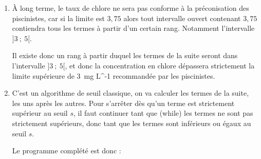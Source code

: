 \documentclass[10pt]{article}
\providecommand{\R}{\mathbb{R}}
\providecommand{\N}{\mathbb{N}}
\providecommand{\np}[2][]{{#2~#1}}
\begin{document}
\begin{enumerate}
\begin{enumerate}
		\item De la question précédente, on retient :
		\begin{itemize}
			\item $\forall n \in \N,\quad v_n \leqslant v_{n+1}$\quad donc la suite $\left(v_n\right)$ est croissante;
			\item $\forall n \in \N,\quad v_n \leqslant 4$ \quad donc la suite $\left(v_n\right)$ est majorée par 4.
		\end{itemize}
D'après le théorème de croissance monotone la suite $\left(v_n\right)$ est donc convergente, vers une limite $\ell$ inférieure ou égale à 4.

		De plus, la suite $\left(v_n\right)$ est définie par récurrence, et la fonction de récurrence : \quad $x\longmapsto 0,92x + 0,3$ \quad est continue sur $\R$, puisque c'est une fonction affine, donc la suite ne peut converger que vers un point fixe de la fonction de récurrence

$\ell$ est donc une solution de l'équation :\quad $\begin{aligned}[t] x = 0,92x + 0,3 &\iff 0,08x = 0,3\\&\iff x = \dfrac{0,3}{0,08}\\&\iff x = 3,75\end{aligned}$

L'équation n'a qu'une solution, donc la suite $\left(v_n\right)$ converge vers $3,75$.
	\end{enumerate}
\item À long terme, le taux de chlore ne sera pas conforme à la préconisation des piscinistes, car si la limite est $3,75$  alors tout intervalle ouvert contenant $3,75$  contiendra tous les termes à partir d'un certain rang. Notamment l'intervalle $]3~;~5[$.

Il existe donc un rang à partir duquel les termes de la suite seront dans l'intervalle $]3~;~5[$, et donc la concentration en chlore dépassera strictement la limite supérieure de \np[mg \cdot L^{-1}]{3} recommandée par les piscinistes.

	\item C'est un algorithme de seuil classique, on va calculer les termes de la suite, les uns après les autres. Pour s'arrêter dès qu'un terme est strictement supérieur au seuil $s$, il faut continuer tant que (while) les termes ne sont pas strictement supérieurs, donc tant que les termes sont inférieurs ou égaux au seuil $s$.

Le programme complété est donc :


\end{enumerate}
\end{document}
